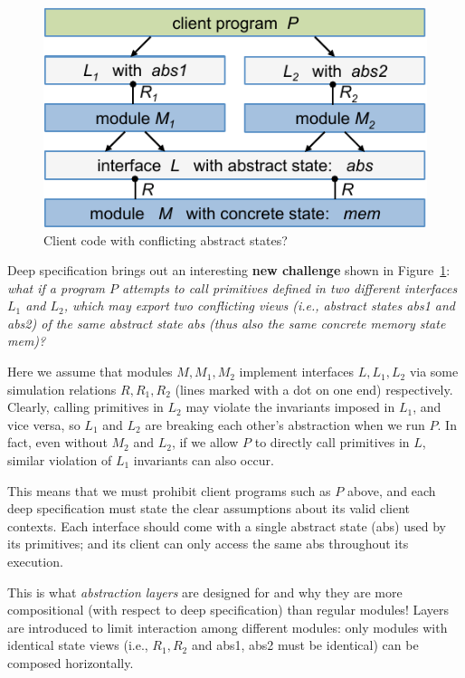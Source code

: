 \begin{figure}[t]\centering
\includegraphics[scale=1]{figs/conflict}
\caption{Client code with conflicting abstract states?}
\hrulefill
\label{fig:conflict}
\end{figure}

Deep specification brings out an interesting {\bf new challenge}
shown in Figure~\ref{fig:conflict}: {\em what if a program $P$ attempts to
call primitives defined in two different interfaces $L_1$ and $L_2$,
which may export two conflicting views (i.e., abstract states
\textsf{abs1} and \textsf{abs2}) of the same abstract state \textsf{abs}
(thus also the same concrete memory state \textsf{mem})?}

Here we assume that modules $M, M_1, M_2$ implement interfaces $L,
L_1, L_2$ via some simulation relations $R, R_1, R_2$ (lines marked
with a dot on one end) respectively. Clearly, calling primitives in
$L_2$ may violate the invariants imposed in $L_1$, and vice versa,
so $L_1$ and $L_2$ are breaking each other's abstraction when we run
$P$. In fact, even without $M_2$ and $L_2$, if we allow $P$ to
directly call primitives in $L$, similar violation of $L_1$ invariants
can also occur.

This means that we must prohibit client programs such as $P$ above,
and each deep specification must state the clear assumptions about its
valid client contexts. Each interface should come with a single
abstract state (\textsf{abs}) used by its primitives; and its client can
only access the same \textsf{abs} throughout its execution. 

This is what {\em abstraction layers} are designed for and why they
are more compositional (with respect to deep specification)
than regular modules! Layers are introduced to limit 
interaction among different modules: only modules with identical
state views (i.e., $R_1, R_2$ and \textsf{abs1},
\textsf{abs2} must be identical) can be composed horizontally.
 

